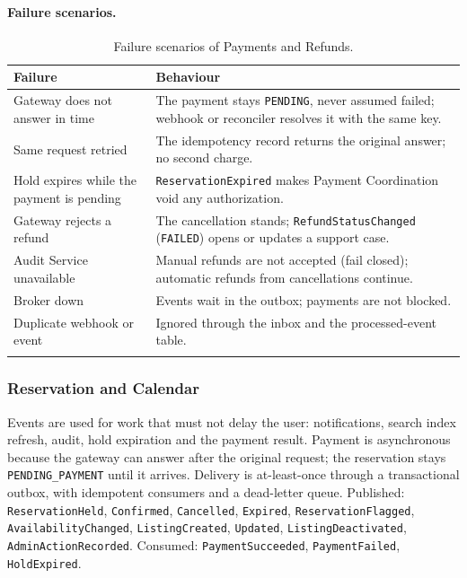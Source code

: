 \paragraph{Failure scenarios.}
\begin{longtable}{@{}L{4.6cm}L{9.2cm}@{}}
\toprule
\textbf{Failure} & \textbf{Behaviour} \\
\midrule
\endhead
Gateway does not answer in time & The payment stays \texttt{PENDING}, never
  assumed failed; webhook or reconciler resolves it with the same key. \\
Same request retried & The idempotency record returns the original answer;
  no second charge. \\
Hold expires while the payment is pending & \texttt{Reservation\allowbreak Expired}
  makes Payment Coordination void any authorization. \\
Gateway rejects a refund & The cancellation stands;
  \texttt{Refund\allowbreak Status\allowbreak Changed} (\texttt{FAILED}) opens or updates a support
  case. \\
Audit Service unavailable & Manual refunds are not accepted (fail closed);
  automatic refunds from cancellations continue. \\
Broker down & Events wait in the outbox; payments are not blocked. \\
Duplicate webhook or event & Ignored through the inbox and the
  processed-event table. \\
\bottomrule
\caption{Failure scenarios of Payments and Refunds.}
\label{tab:pay-failures}
\end{longtable}
\endgroup

\subsubsection{Reservation and Calendar}
Events are used for work that must not delay the user: notifications, search
index refresh, audit, hold expiration and the payment result. Payment is
asynchronous because the gateway can answer after the original request; the
reservation stays \texttt{PENDING\_PAYMENT} until it arrives. Delivery is
at-least-once through a transactional outbox, with idempotent consumers and a
dead-letter queue. Published: \texttt{ReservationHeld}, \texttt{Confirmed},
\texttt{Cancelled}, \texttt{Expired}, \texttt{ReservationFlagged},
\texttt{AvailabilityChanged}, \texttt{ListingCreated}, \texttt{Updated},
\texttt{ListingDeactivated}, \texttt{AdminActionRecorded}. Consumed:
\texttt{PaymentSucceeded}, \texttt{PaymentFailed}, \texttt{HoldExpired}.

